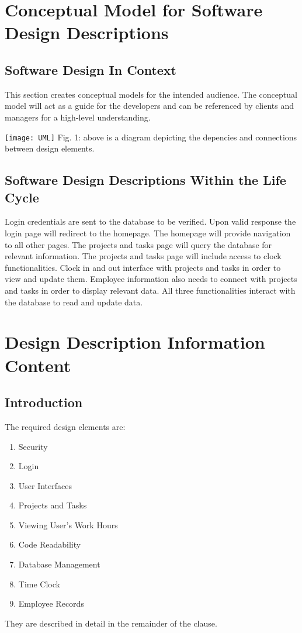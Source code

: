 \documentclass[letterpaper,10pt,titlepage,journal,compsoc,draftclsnofoot,onecolumn]{IEEEtran}
\begin{document}
\section{Conceptual Model for Software Design Descriptions}
\subsection{Software Design In Context}

This section creates conceptual models for the intended audience. The conceptual model will act as a guide for the developers and can be referenced by clients and managers for a high-level understanding.

\texttt{[image: UML]}
\newline Fig. 1: above is a diagram depicting the depencies and connections between design elements.
\subsection{Software Design Descriptions Within the Life Cycle}

Login credentials are sent to the database to be verified. Upon valid response the login page will redirect to the homepage. The homepage will provide navigation to all other pages. The projects and tasks page will query the database for relevant information. The projects and tasks page will include access to clock functionalities. Clock in and out interface with projects and tasks in order to view and update them. Employee information also needs to connect with projects and tasks in order to display relevant data. All three functionalities interact with the database to read and update data. 

\section{Design Description Information Content}
\subsection{Introduction}

The required design elements are:
\begin{enumerate}
\item{Security}
\item{Login}
\item{User Interfaces}
\item{Projects and Tasks}
\item{Viewing User's Work Hours}
\item{Code Readability}
\item{Database Management}
\item{Time Clock}
\item{Employee Records}
\end{enumerate}
They are described in detail in the remainder of the clause.
\end{document}
